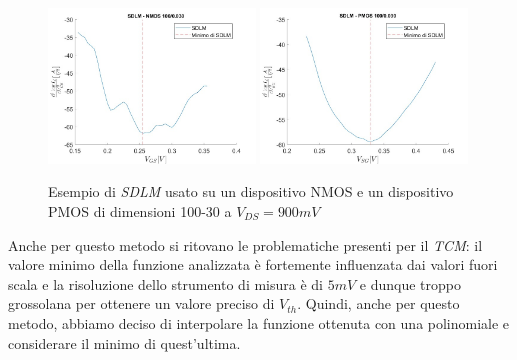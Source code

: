 \documentclass[12pt, letterpaper]{book}
\begin{document}
\begin{figure}[H]
  \centering
  \includegraphics[width=0.49\textwidth]{SDLM-N4-100-30-NoFit}
  \includegraphics[width=0.49\textwidth]{SDLM-P1-100-30-NoFit}
  \caption{Esempio di \emph{SDLM} usato su un dispositivo NMOS e un dispositivo PMOS di dimensioni 100-30 a $V_{DS} = 900 mV$}
\end{figure}


Anche per questo metodo si ritovano le problematiche presenti per il \emph{TCM}: il valore minimo della funzione analizzata è fortemente influenzata dai valori fuori scala e la risoluzione dello strumento di misura è di $5 mV$ e dunque troppo grossolana per ottenere un valore preciso di $V_{th}$.
Quindi, anche per questo metodo, abbiamo deciso di interpolare la funzione ottenuta con una polinomiale e considerare il minimo di quest'ultima. \\
\end{document}
